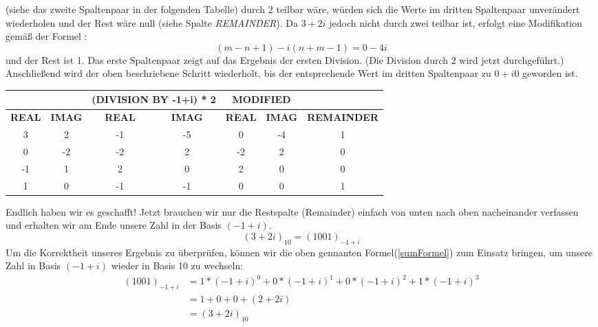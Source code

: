 \documentclass[course=erap]{aspdoc}
\begin{document}
    (siehe das zweite Spaltenpaar in der folgenden Tabelle) durch 2 teilbar wäre, würden sich die Werte im dritten Spaltenpaar unverändert wiederholen und der Rest wäre null (siehe Spalte \textit{REMAINDER}). Da $3 + 2 i$ jedoch nicht durch zwei teilbar ist, erfolgt eine Modifikation gemäß der Formel :
    \[(m - n + 1) - i(n + m - 1)= 0 - 4  i\]
    und der Rest ist 1. Das erste Spaltenpaar zeigt auf das Ergebnis der ersten Division. (Die Division durch 2 wird jetzt durchgeführt.) Anschließend wird der oben beschriebene Schritt wiederholt, bis der entsprechende Wert im dritten Spaltenpaar zu $0 + i0$ geworden ist.
    \\

    \begin{table}[!ht]
        \centering
        \begin{tabular}{|c|c|cc|cc|c|}
            \hline
            &               & \multicolumn{2}{c|}{\textbf{(DIVISION BY -1+i) * 2}} & \multicolumn{2}{c|}{\textbf{MODIFIED}}             &                    \\ \hline
            \textbf{REAL} & \textbf{IMAG} & \multicolumn{1}{c|}{\textbf{REAL}}  & \textbf{IMAG}  & \multicolumn{1}{c|}{\textbf{REAL}} & \textbf{IMAG} & \textbf{REMAINDER} \\ \hline
            3             & 2             & \multicolumn{1}{c|}{-1}             & -5             & \multicolumn{1}{c|}{0}             & -4            & 1                  \\ \hline
            0             & -2            & \multicolumn{1}{c|}{-2}             & 2              & \multicolumn{1}{c|}{-2}            & 2             & 0                  \\ \hline
            -1            & 1             & \multicolumn{1}{c|}{2}              & 0              & \multicolumn{1}{c|}{2}             & 0             & 0                  \\ \hline
            1             & 0             & \multicolumn{1}{c|}{-1}             & -1             & \multicolumn{1}{c|}{0}             & 0             & 1                  \\ \hline
        \end{tabular}
    \end{table}

    Endlich haben wir es geschafft! Jetzt brauchen wir nur die Restspalte (Remainder) einfach von unten nach oben nacheinander verfassen und erhalten wir am Ende unsere Zahl in der Basis $(-1+i)$.
    \[(3 + 2i)_{10} = (1001)_{-1+i}\]
    \newline
    Um die Korrektheit unseres Ergebnis zu überprüfen, können wir die oben gennanten Formel(\ref{sumFormel}) zum Einsatz bringen, um unsere Zahl in Basis $(-1+i)$ wieder in Basis 10 zu wechseln:
    \begin{equation*}
        \begin{split}
        (1001)_{-1+i} &= 1*(-1+i)^0 + 0*(-1+i)^1 + 0*(-1+i)^2 +1*(-1+i)^3 \\
        &=1 + 0 + 0 + (2 + 2i) \\
        &= (3+2i)_{10}
        \end{split}
    \end{equation*}
\end{document}
